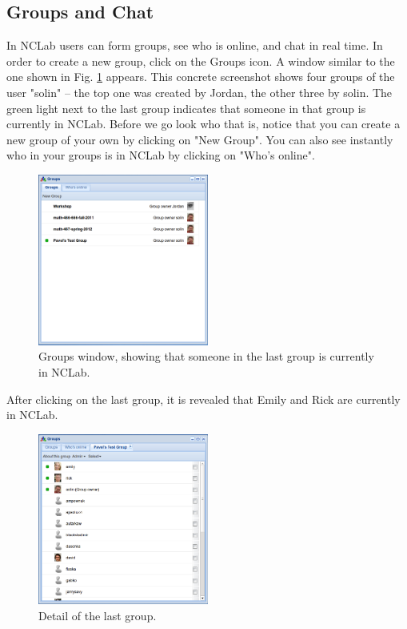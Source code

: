 \documentclass[article,A4,12pt]{llncs}
\begin{document}
\subsection{Groups and Chat}

In NCLab users can form groups, see who is online, and chat in real time. In order to 
create a new group, click on the Groups icon. A window similar to the one shown 
in Fig. \ref{fig:groups} appears. This concrete screenshot shows four groups of the 
user "solin" -- the top one was created by Jordan, the other three by solin. The 
green light next to the last group indicates that someone in that group
is currently in NCLab. Before we go look who that is, notice that you can create a
new group of your own by clicking on "New Group". You can also see instantly who in your 
groups is in NCLab by clicking on "Who's online".


\begin{figure}[!ht]
\begin{center}
\includegraphics[width=0.5\textwidth]{img/groups.png}
\end{center}
\caption{Groups window, showing that someone in the last group is currently in NCLab.}
\label{fig:groups}
\end{figure}

\noindent 
After clicking on the last group, it is revealed that Emily and Rick are currently in NCLab. 

\begin{figure}[!ht]
\begin{center}
\includegraphics[width=0.5\textwidth]{img/groups-2.png}
\end{center}
\caption{Detail of the last group.}
\label{fig:groups-2}
\end{figure}
\end{document}
